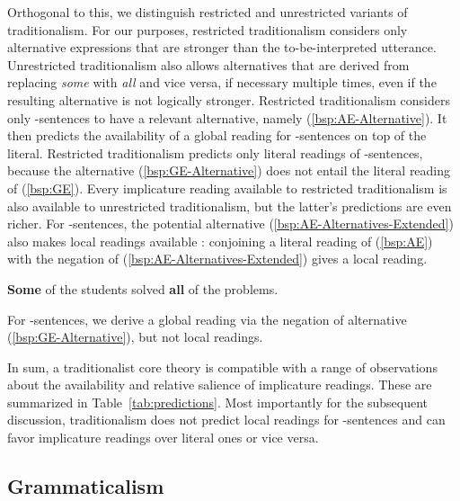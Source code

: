 \documentclass[fleqn,reqno,10pt]{article}
\newcommand{\as}{\acro{as}}
\renewcommand{\es}{\acro{es}}
\renewcommand{\mymark}[1]{\textbf{#1}}
\begin{document}
Orthogonal to this, we distinguish restricted and unrestricted
variants of traditionalism. For our purposes, restricted
traditionalism considers only alternative expressions that are
stronger than the to-be-interpreted utterance. Unrestricted
traditionalism also allows alternatives that are derived from
replacing \emph{some} with \emph{all} and vice versa, if necessary
multiple times, even if the resulting alternative is not logically
stronger. Restricted traditionalism considers only \as-sentences to
have a relevant alternative, namely (\ref{bsp:AE-Alternative}). It
then predicts the availability of a global reading for \as-sentences
on top of the literal. Restricted traditionalism predicts only literal
readings of \es-sentences, because the alternative
(\ref{bsp:GE-Alternative}) does not entail the literal reading of
(\ref{bsp:GE}). Every implicature reading available to restricted
traditionalism is also available to unrestricted traditionalism, but
the latter's predictions are even richer. For \as-sentences, the
potential alternative (\ref{bsp:AE-Alternatives-Extended}) also makes
local readings available
\citep[e.g.][]{Sauerland2004:Scalar-Implicat}: conjoining a literal
reading of (\ref{bsp:AE}) with the negation of
(\ref{bsp:AE-Alternatives-Extended}) gives a local reading.

\begin{exe}
\ex \label{bsp:AE-Alternatives-Extended} \mymark{Some} of the students solved \mymark{all} of the problems.
\end{exe}

\noindent For \es-sentences, we derive a global reading via the
negation of alternative (\ref{bsp:GE-Alternative}), but not local
readings.

In sum, a traditionalist core theory is compatible with a range of
observations about the availability and relative salience of
implicature readings. These are summarized in
Table~\ref{tab:predictions}. Most importantly for the subsequent
discussion, traditionalism does not predict local readings for
\es-sentences and can favor implicature readings over literal ones or
vice versa.

\subsection{Grammaticalism}
\label{sec:grammaticalism}
\end{document}
